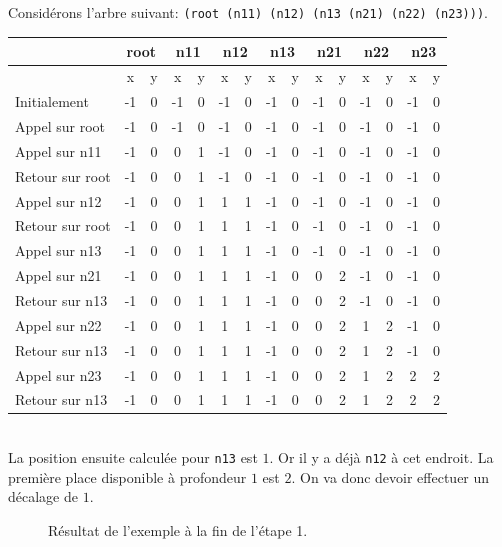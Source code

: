 \subparagraph{} Considérons l'arbre suivant: \verb|(root (n11) (n12) (n13 (n21) (n22) (n23)))|. \\
\begin{tabular}{|l|c|c|c|c|c|c|c|c|c|c|c|c|c|c|}
	\hline
	 & \multicolumn{2}{|c|}{root} & \multicolumn{2}{|c|}{n11} & \multicolumn{2}{|c|}{n12} & \multicolumn{2}{|c|}{n13} & \multicolumn{2}{|c|}{n21} & \multicolumn{2}{|c|}{n22} & \multicolumn{2}{|c|}{n23}\\ \hline
	& x & y & x & y & x & y & x & y & x & y & x & y & x & y \\ \hline
	Initialement & -1 & 0 & -1 & 0 & -1 & 0 & -1 & 0 & -1 & 0 & -1 & 0 & -1 & 0 \\ \hline
	Appel sur root & -1 & 0 & -1 & 0 & -1 & 0 & -1 & 0 & -1 & 0 & -1 & 0 & -1 & 0 \\ \hline
	Appel sur n11 & -1 & 0 & 0 & 1 & -1 & 0 & -1 & 0 & -1 & 0 & -1 & 0 & -1 & 0 \\ \hline
	Retour sur root & -1 & 0 & 0 & 1 & -1 & 0 & -1 & 0 & -1 & 0 & -1 & 0 & -1 & 0 \\ \hline
	Appel sur n12 & -1 & 0 & 0 & 1 & 1 & 1 & -1 & 0 & -1 & 0 & -1 & 0 & -1 & 0 \\ \hline
	Retour sur root & -1 & 0 & 0 & 1 & 1 & 1 & -1 & 0 & -1 & 0 & -1 & 0 & -1 & 0 \\ \hline
	Appel sur n13 & -1 & 0 & 0 & 1 & 1 & 1 & -1 & 0 & -1 & 0 & -1 & 0 & -1 & 0 \\ \hline
	Appel sur n21 & -1 & 0 & 0 & 1 & 1 & 1 & -1 & 0 & 0 & 2 & -1 & 0 & -1 & 0 \\ \hline
	Retour sur n13 & -1 & 0 & 0 & 1 & 1 & 1 & -1 & 0 & 0 & 2 & -1 & 0 & -1 & 0 \\ \hline
	Appel sur n22 & -1 & 0 & 0 & 1 & 1 & 1 & -1 & 0 & 0 & 2 & 1 & 2 & -1 & 0 \\ \hline
	Retour sur n13 & -1 & 0 & 0 & 1 & 1 & 1 & -1 & 0 & 0 & 2 & 1 & 2 & -1 & 0 \\ \hline
	Appel sur n23 & -1 & 0 & 0 & 1 & 1 & 1 & -1 & 0 & 0 & 2 & 1 & 2 & 2 & 2 \\ \hline
	Retour sur n13 & -1 & 0 & 0 & 1 & 1 & 1 & -1 & 0 & 0 & 2 & 1 & 2 & 2 & 2 \\ \hline
\end{tabular}\\
La position ensuite calculée pour \verb|n13| est $1$. Or il y a déjà \verb|n12| à cet endroit. La première place disponible à profondeur $1$ est $2$. On va donc devoir effectuer un décalage de $1$.

\begin{figure}[h] \centering \resizebox {!}{4cm} {
}
\caption{Résultat de l'exemple à la fin de l'étape 1.}
\end{figure}

